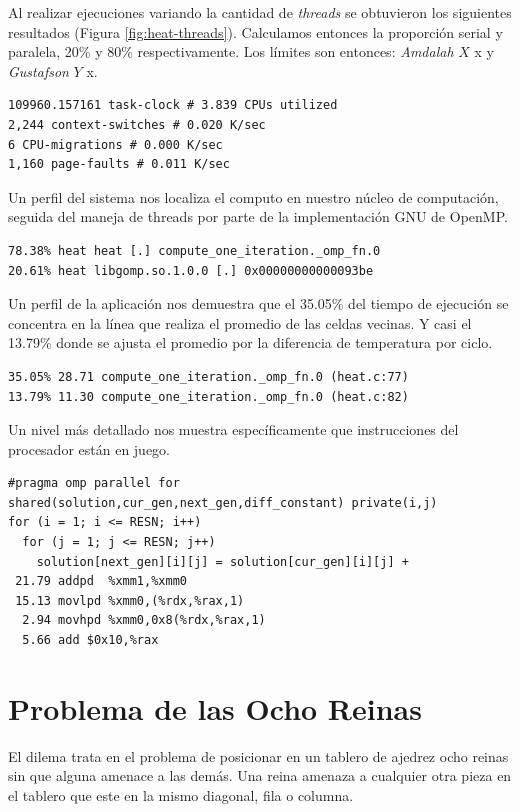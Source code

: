 \documentclass[a4paper]{report}
\begin{document}
Al realizar ejecuciones variando la cantidad de {\it threads} se obtuvieron los siguientes resultados (Figura \ref{fig:heat-threads}). Calculamos entonces la proporción serial y paralela, 20\% y 80\% respectivamente. Los límites son entonces: {\it Amdalah} $ X $ x y {\it Gustafson} $ Y $ x.

\begin{verbatim}
109960.157161 task-clock # 3.839 CPUs utilized
2,244 context-switches # 0.020 K/sec
6 CPU-migrations # 0.000 K/sec
1,160 page-faults # 0.011 K/sec
\end{verbatim}

Un perfil del sistema nos localiza el computo en nuestro núcleo de computación, seguida del maneja de threads por parte de la implementación GNU de OpenMP.

\begin{verbatim}
78.38% heat heat [.] compute_one_iteration._omp_fn.0
20.61% heat libgomp.so.1.0.0 [.] 0x00000000000093be
\end{verbatim}

Un perfil de la aplicación nos demuestra que el 35.05\% del tiempo de ejecución se concentra en la línea que realiza el promedio de las celdas vecinas. Y casi el 13.79\% donde se ajusta el promedio por la diferencia de temperatura por ciclo.

\begin{verbatim}
35.05% 28.71 compute_one_iteration._omp_fn.0 (heat.c:77)
13.79% 11.30 compute_one_iteration._omp_fn.0 (heat.c:82)
\end{verbatim}

Un nivel más detallado nos muestra específicamente que instrucciones del procesador están en juego.

\begin{verbatim}
#pragma omp parallel for shared(solution,cur_gen,next_gen,diff_constant) private(i,j)
for (i = 1; i <= RESN; i++)
  for (j = 1; j <= RESN; j++)
    solution[next_gen][i][j] = solution[cur_gen][i][j] +
 21.79 addpd  %xmm1,%xmm0
 15.13 movlpd %xmm0,(%rdx,%rax,1)
  2.94 movhpd %xmm0,0x8(%rdx,%rax,1)
  5.66 add $0x10,%rax
\end{verbatim}

\section{Problema de las Ocho Reinas}

El dilema trata en el problema de posicionar en un tablero de ajedrez ocho
reinas sin que alguna amenace a las demás. Una reina amenaza a cualquier otra
pieza en el tablero que este en la mismo diagonal, fila o columna.
\end{document}
